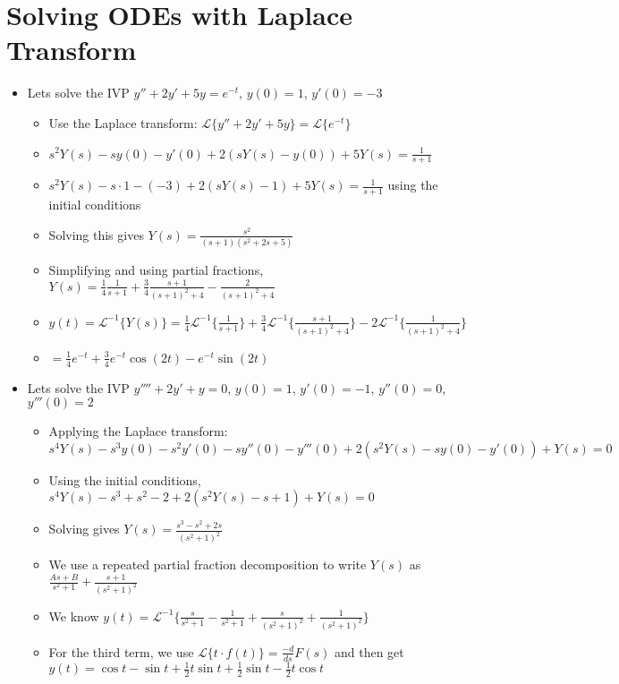 \documentclass[12pt]{article}
\begin{document}
\section{Solving ODEs with Laplace Transform}
\begin{itemize}
    \item Lets solve the IVP $y'' + 2y' + 5y = e^{-t}$, $y(0) = 1$, $y'(0) = -3$ \begin{itemize}
        \item Use the Laplace transform: $\mathcal{L} \{y'' + 2y' + 5y\} = \mathcal{L} \{e^{-t} \}$
        \item $s^2 Y(s) - sy(0) - y'(0) + 2(sY(s) - y(0)) + 5Y(s) = \frac{1}{s+1}$
        \item $s^2 Y(s) - s \cdot 1 - (-3) + 2(sY(s) - 1) + 5 Y(s) = \frac{1}{s+1}$ using the initial conditions
        \item Solving this gives $Y(s) = \frac{s^2}{(s+1)(s^2+2s+5)}$
        \item Simplifying and using partial fractions, $Y(s) = \frac{1}{4} \frac{1}{s+1} + \frac{3}{4} \frac{s+1}{(s+1)^2 + 4} - \frac{2}{(s+1)^2 + 4}$
        \item $y(t) = \mathcal{L} ^{-1} \{Y(s) \} = \frac{1}{4} \mathcal{L} ^{-1} \{\frac{1}{s+1}\} + \frac{3}{4} \mathcal{L} ^{-1} \{\frac{s+1}{(s+1)^2+4}\} - 2 \mathcal{L}^{-1} \{ \frac{1}{(s+1)^2+4}\}$ 
        \item $ = \frac{1}{4} e^{-t} + \frac{3}{4} e^{-t} \cos (2t) - e^{-t} \sin (2t)$
    \end{itemize}
    \item Lets solve the IVP $y'''' + 2y' + y = 0$, $y(0) = 1$, $y'(0) = -1$, $y''(0) = 0$, $y'''(0) = 2$ \begin{itemize}
        \item Applying the Laplace transform: $s^4 Y(s) - s^3 y(0) - s^2 y'(0) - s y''(0) - y'''(0) + 2 (s^2 Y(s) - sy(0) - y'(0)) + Y(s) = 0$
        \item Using the initial conditions, $s^4 Y(s) - s^3 + s^2 - 2 + 2(s^2Y(s) - s + 1) + Y(s) = 0$
        \item Solving gives $Y(s) = \frac{s^3 - s^2 + 2s}{(s^2+1)^2}$
        \item We use a repeated partial fraction decomposition to write $Y(s)$ as $\frac{As+B}{s^2+1} + \frac{s+1}{(s^2+1)^2}$
        \item We know $y(t) = \mathcal{L} ^{-1} \{ \frac{s}{s^2+1} - \frac{1}{s^2+1} + \frac{s}{(s^2+1)^2} + \frac{1}{(s^2+1)^2} \}$
        \item For the third term, we use $\mathcal{L} \{t \cdot f(t) \} = \frac{-d}{ds} F(s)$ and then get $ y(t) = \cos t - \sin t + \frac{1}{2} t \sin t + \frac{1}{2} \sin t - \frac{1}{2} t \cos t $
    \end{itemize}
\end{itemize}
\end{document}
